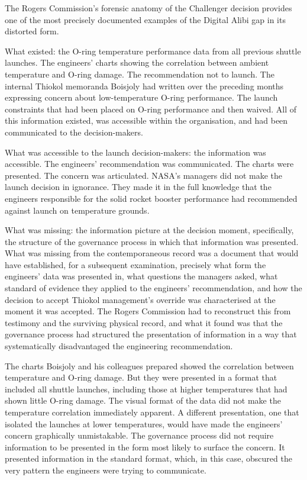 The Rogers Commission's forensic anatomy of the Challenger decision provides one of the most precisely documented examples of the Digital Alibi gap in its distorted form.

What existed: the O-ring temperature performance data from all previous shuttle launches. The engineers' charts showing the correlation between ambient temperature and O-ring damage. The recommendation not to launch. The internal Thiokol memoranda Boisjoly had written over the preceding months expressing concern about low-temperature O-ring performance. The launch constraints that had been placed on O-ring performance and then waived. All of this information existed, was accessible within the organisation, and had been communicated to the decision-makers.

What was accessible to the launch decision-makers: the information was accessible. The engineers' recommendation was communicated. The charts were presented. The concern was articulated. NASA's managers did not make the launch decision in ignorance. They made it in the full knowledge that the engineers responsible for the solid rocket booster performance had recommended against launch on temperature grounds.

What was missing: the information picture at the decision moment, specifically, the structure of the governance process in which that information was presented. What was missing from the contemporaneous record was a document that would have established, for a subsequent examination, precisely what form the engineers' data was presented in, what questions the managers asked, what standard of evidence they applied to the engineers' recommendation, and how the decision to accept Thiokol management's override was characterised at the moment it was accepted. The Rogers Commission had to reconstruct this from testimony and the surviving physical record, and what it found was that the governance process had structured the presentation of information in a way that systematically disadvantaged the engineering recommendation.

The charts Boisjoly and his colleagues prepared showed the correlation between temperature and O-ring damage. But they were presented in a format that included all shuttle launches, including those at higher temperatures that had shown little O-ring damage. The visual format of the data did not make the temperature correlation immediately apparent. A different presentation, one that isolated the launches at lower temperatures, would have made the engineers' concern graphically unmistakable. The governance process did not require information to be presented in the form most likely to surface the concern. It presented information in the standard format, which, in this case, obscured the very pattern the engineers were trying to communicate.

